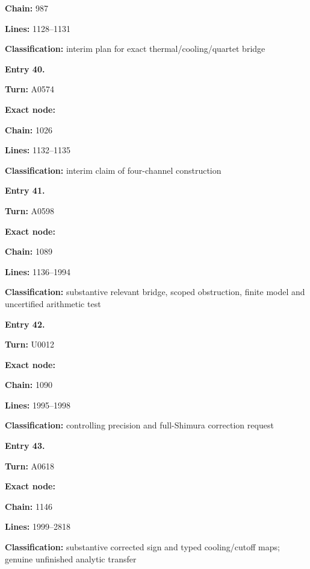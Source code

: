 \documentclass[10pt,a4paper,oneside]{report}
\begin{document}
\textbf{Chain:} 987

\textbf{Lines:} 1128--1131

\textbf{Classification:} interim plan for exact thermal/cooling/quartet
bridge


\textbf{Entry 40.}

\textbf{Turn:} A0574

\textbf{Exact node:} \protect{}

\textbf{Chain:} 1026

\textbf{Lines:} 1132--1135

\textbf{Classification:} interim claim of four-channel construction


\textbf{Entry 41.}

\textbf{Turn:} A0598

\textbf{Exact node:} \protect{}

\textbf{Chain:} 1089

\textbf{Lines:} 1136--1994

\textbf{Classification:} substantive relevant bridge, scoped
obstruction, finite model and uncertified arithmetic test


\textbf{Entry 42.}

\textbf{Turn:} U0012

\textbf{Exact node:} \protect{}

\textbf{Chain:} 1090

\textbf{Lines:} 1995--1998

\textbf{Classification:} controlling precision and full-Shimura
correction request


\textbf{Entry 43.}

\textbf{Turn:} A0618

\textbf{Exact node:} \protect{}

\textbf{Chain:} 1146

\textbf{Lines:} 1999--2818

\textbf{Classification:} substantive corrected sign and typed
cooling/cutoff maps; genuine unfinished analytic transfer

\end{document}
